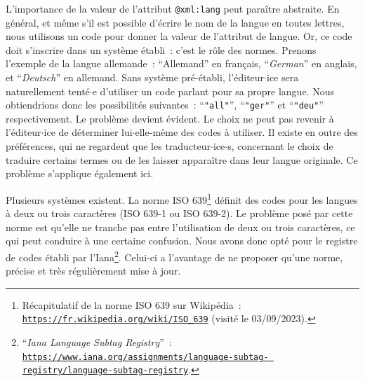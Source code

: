 L'importance de la valeur de l'attribut \texttt{@xml:lang} peut paraître abstraite. En général, et même s'il est possible d'écrire le nom de la langue en toutes lettres, nous utilisons un code pour donner la valeur de l'attribut de langue. Or, ce code doit s'inscrire dans un système établi~: c'est le rôle des normes. Prenons l'exemple de la langue allemande~: \enquote{Allemand} en français, \enquote{\textit{German}} en anglais, et \enquote{\textit{Deutsch}} en allemand. Sans système pré-établi, l'éditeur$\cdot$ice sera naturellement tenté$\cdot$e d'utiliser un code parlant pour sa propre langue. Nous obtiendrions donc les possibilités suivantes~: \enquote{\texttt{"all"}}, \enquote{\texttt{"ger"}} et \enquote{\texttt{"deu"}} respectivement. Le problème devient évident. Le choix ne peut pas revenir à l'éditeur$\cdot$ice de déterminer lui$\cdot$elle-même des codes à utiliser. Il existe en outre des préférences, qui ne regardent que les traducteur$\cdot$ice$\cdot$s, concernant le choix de traduire certains termes ou de les laisser apparaître dans leur langue originale. Ce problème s'applique également ici.  

Plusieurs systèmes existent. La norme ISO 639\footnote{Récapitulatif de la norme ISO 639 sur Wikipédia~: \texttt{\href{https://fr.wikipedia.org/wiki/ISO_639}{https://fr.wikipedia.org/wiki/ISO\_{}639}} (visité le 03/09/2023).} définit des codes pour les langues à deux ou trois caractères (ISO 639-1 ou ISO 639-2). Le problème posé par cette norme est qu'elle ne tranche pas entre l'utilisation de deux ou trois caractères, ce qui peut conduire à une certaine confusion. Nous avons donc opté pour le registre de codes établi par l'Iana\footnote{\enquote{\textit{Iana Language Subtag Registry}}~: \texttt{\href{https://www.iana.org/assignments/language-subtag-registry/language-subtag-registry}{https://www.iana.org/assignments/language-subtag- registry/language-subtag-registry}}.}. Celui-ci a l'avantage de ne proposer qu'une norme, précise et très régulièrement mise à jour. 